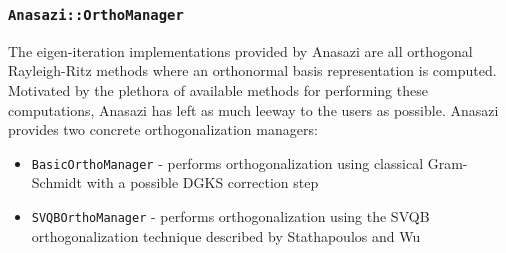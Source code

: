 \documentclass[acmtoms]{acmtrans2m}
\newcommand{\aspace}[1]{\texttt{#1}}
\begin{document}
\subsubsection{\aspace{Anasazi::OrthoManager}}

The eigen-iteration implementations provided by Anasazi are all orthogonal 
Rayleigh-Ritz methods where an orthonormal basis representation is computed. 
Motivated by the plethora of available methods for performing these 
computations, Anasazi has left as much leeway to the users as possible. 
Anasazi provides two concrete orthogonalization managers:
\begin{itemize}
\item
  \aspace{BasicOrthoManager} - performs orthogonalization using
  classical Gram-Schmidt with a possible DGKS correction step~\cite{dgks:76}
\item
  \aspace{SVQBOrthoManager} - performs orthogonalization using the
  SVQB orthogonalization technique described by Stathapoulos and
  Wu~\cite{Stathopoulos:2002:BOP}
\end{itemize}





\end{document}
